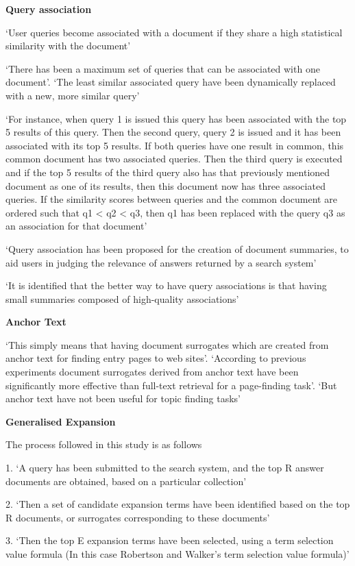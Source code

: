 \documentclass[]{article}
\begin{document}
{{\textbf{Query association}

‘User queries become associated with a document if they share a high statistical similarity with the document’

‘There has been a maximum set of queries that can be associated with one document’. ‘The least similar associated query have been dynamically replaced with a new, more similar query’ 

‘For instance, when query 1 is issued this query has been associated with the top 5 results of this query. Then the second query, query 2 is issued and it has been associated with its top 5 results. If both queries have one result in common, this common document has two associated queries. Then the third query is executed and if the top 5 results of the third query also has that previously mentioned document as one of its results, then this document now has three associated queries. If the similarity scores between queries and the common document are ordered such that q1 < q2 < q3, then q1 has been replaced with the query q3 as an association for that document’ 

‘Query association has been proposed for the creation of document summaries, to aid users in judging the relevance of answers returned by a search system’

‘It is identified that the better way to have query associations is that having small summaries composed of high-quality associations’

\textbf{Anchor Text}

‘This simply means that having document surrogates which are created from anchor text for finding entry pages to web sites’. ‘According to previous experiments document surrogates derived from anchor text have been significantly more effective than full-text retrieval for a page-finding task’. ‘But anchor text have not been useful for topic finding tasks’

\textbf{Generalised Expansion}

The process followed in this study is as follows

1.	‘A query has been submitted to the search system, and the top R answer documents are obtained, based on a particular collection’

2.	‘Then a set of candidate expansion terms have been identified based on the top R documents, or surrogates corresponding to these documents’

3.	‘Then the top E expansion terms have been selected, using a term selection value formula (In this case Robertson and Walker’s term selection value formula)’

}}
\end{document}
